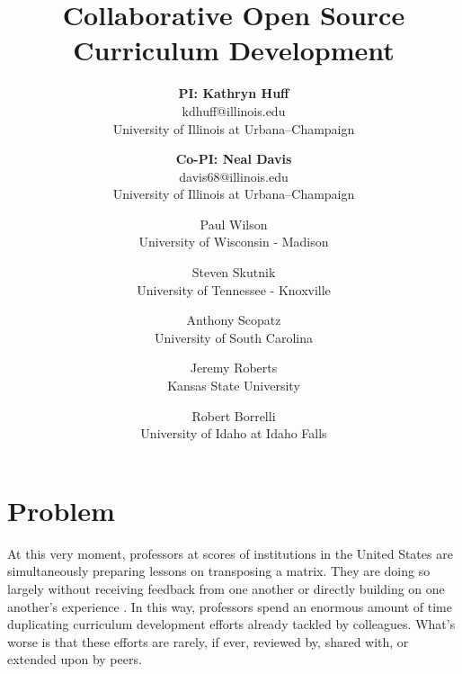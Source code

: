 \documentclass[11pt]{article}
\newcommand{\authorsite}{arfc.npre.illinois.edu}
\begin{document}
          \title{Collaborative Open Source Curriculum Development}
          \author{\textbf{PI: Kathryn Huff}\\%
                  kdhuff@illinois.edu\\
                  University of Illinois at Urbana--Champaign
                  \and
           \textbf{Co-PI: Neal Davis}\\
                  davis68@illinois.edu\\
                   University of Illinois at Urbana--Champaign
                  \and
           Paul Wilson\\
                  University of Wisconsin - Madison 
                  \and
          Steven Skutnik\\
                  University of Tennessee - Knoxville
                  \and
          Anthony Scopatz\\
                  University of South Carolina 
                  \and
          Jeremy Roberts\\
                  Kansas State University 
                  \and
          Robert Borrelli\\
                  University of Idaho at Idaho Falls
          }
          \maketitle

          \pagestyle{fancy}
          \lhead{\textcolor{gray}{SIIP Full Proposal}}
          \rhead{\textcolor{gray}{Collaborative Open-Source Curriculum Development}}
          \renewcommand{\headrulewidth}{0pt}
          \renewcommand{\footrulewidth}{0pt}

          \section{Problem}
          At this very moment, professors at scores of institutions in the United States are 
          simultaneously preparing lessons on transposing a matrix.
          They are doing so largely without receiving feedback from one another 
          or directly building on one another's experience 
          \cite{green_building_2014}. In this way, 
          professors spend an enormous amount of time duplicating curriculum 
          development efforts already tackled by colleagues. What's worse is 
          that these efforts are rarely, if ever, reviewed by, shared with, or 
          extended upon by peers.
          
\end{document}
